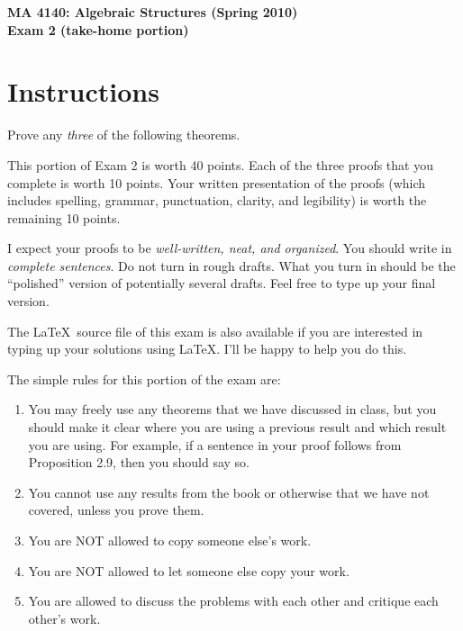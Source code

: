 \documentclass[11pt]{article}
\theoremstyle{definition}
\begin{document}
\begin{center}

{\Large\bf MA 4140: Algebraic Structures (Spring 2010)}\\
\smallskip
{\Large\bf Exam 2 (take-home portion)}

\bigskip


\end{center}

\setlength{\fboxsep}{10pt}

\section*{Instructions}

Prove any \emph{three} of the following theorems.

\bigskip

This portion of Exam 2 is worth 40 points.  Each of the three proofs that you complete is worth 10 points.  Your written presentation of the proofs (which includes spelling, grammar, punctuation, clarity, and legibility) is worth the remaining 10 points.

\bigskip

I expect your proofs to be \emph{well-written, neat, and organized}.  You should write in \emph{complete sentences}.  Do not turn in rough drafts.  What you turn in should be the ``polished'' version of potentially several drafts.  Feel free to type up your final version.  

\bigskip

The \LaTeX\ source file of this exam is also available if you are interested in typing up your solutions using \LaTeX.  I'll be happy to help you do this.

\bigskip

The simple rules for this portion of the exam are:

\begin{enumerate}
\item You may freely use any theorems that we have discussed in class, but you should make it clear where you are using a previous result and which result you are using.  For example, if a sentence in your proof follows from Proposition 2.9, then you should say so.
\item You cannot use any results from the book or otherwise that we have not covered, unless you prove them.
\item You are NOT allowed to copy someone else's work.
\item You are NOT allowed to let someone else copy your work.
\item You are allowed to discuss the problems with each other and critique each other's work.
\end{enumerate}
\end{document}
